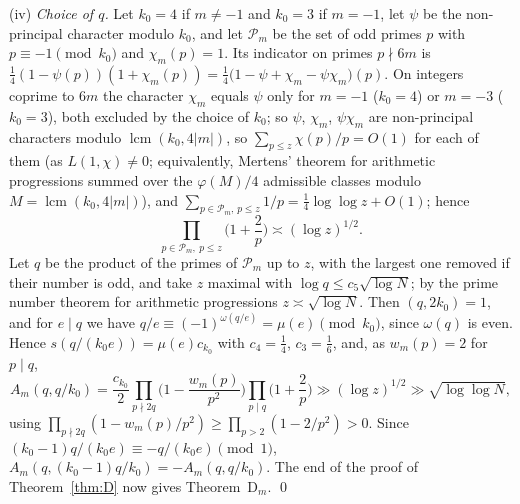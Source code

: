 \documentclass[11pt]{amsart}
\theoremstyle{remark}
\begin{document}
(iv) \emph{Choice of $q$.} Let $k_0=4$ if $m\neq-1$ and $k_0=3$ if $m=-1$, let $\psi$ be the non-principal character modulo $k_0$, and let $\mathcal P_m$ be the set of odd primes $p$ with $p\equiv-1\pmod{k_0}$ and $\chi_m(p)=1$. Its indicator on primes $p\nmid6m$ is $\frac14(1-\psi(p))(1+\chi_m(p))=\frac14\big(1-\psi+\chi_m-\psi\chi_m\big)(p)$. On integers coprime to $6m$ the character $\chi_m$ equals $\psi$ only for $m=-1$ ($k_0=4$) or $m=-3$ ($k_0=3$), both excluded by the choice of $k_0$; so $\psi$, $\chi_m$, $\psi\chi_m$ are non-principal characters modulo $\operatorname{lcm}(k_0,4|m|)$, so $\sum_{p\le z}\chi(p)/p=O(1)$ for each of them (as $L(1,\chi)\neq0$; equivalently, Mertens' theorem for arithmetic progressions \cite{Wi} summed over the $\varphi(M)/4$ admissible classes modulo $M=\operatorname{lcm}(k_0,4|m|)$), and $\sum_{p\in\mathcal P_m,\,p\le z}1/p=\frac14\log\log z+O(1)$; hence
\[
\prod_{p\in\mathcal P_m,\ p\le z}\Big(1+\frac2p\Big)\asymp(\log z)^{1/2}.
\]
Let $q$ be the product of the primes of $\mathcal P_m$ up to $z$, with the largest one removed if their number is odd, and take $z$ maximal with $\log q\le c_5\sqrt{\log N}$; by the prime number theorem for arithmetic progressions $z\asymp\sqrt{\log N}$. Then $(q,2k_0)=1$, and for $e\mid q$ we have $q/e\equiv(-1)^{\omega(q/e)}=\mu(e)\pmod{k_0}$, since $\omega(q)$ is even. Hence $s(q/(k_0e))=\mu(e)c_{k_0}$ with $c_4=\frac14$, $c_3=\frac16$, and, as $w_m(p)=2$ for $p\mid q$,
\[
A_m(q,q/k_0)=\frac{c_{k_0}}2\prod_{p\nmid2q}\Big(1-\frac{w_m(p)}{p^2}\Big)\prod_{p\mid q}\Big(1+\frac2p\Big)\gg(\log z)^{1/2}\gg\sqrt{\log\log N},
\]
using $\prod_{p\nmid 2q}(1-w_m(p)/p^2)\ge\prod_{p>2}(1-2/p^2)>0$. Since $(k_0-1)q/(k_0e)\equiv-q/(k_0e)\pmod1$, $A_m(q,(k_0-1)q/k_0)=-A_m(q,q/k_0)$. The end of the proof of Theorem~\ref{thm:D} now gives Theorem~D$_m$. \qed
\end{document}
